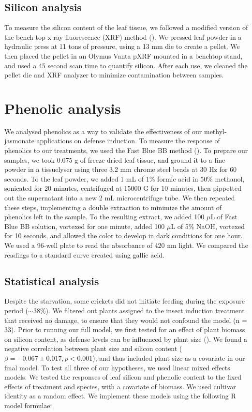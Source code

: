 \documentclass[12pt, letterpaper, ]{report}
\begin{document}
\subsection{Silicon analysis}

To measure the silicon content of the leaf tissue, we followed a modified version of the bench-top x-ray fluorescence (XRF) method (\cite{reidinger_rapid_2012}). We pressed leaf powder in a hydraulic press at 11 tons of pressure, using a 13 mm die to create a pellet. We then placed the pellet in an Olymus Vanta pXRF mounted in a benchtop stand, and used a 45 second scan time to quantify silicon. After each use, we cleaned the pellet die and XRF analyzer to minimize contamination between samples.

\section{Phenolic analysis}

We analysed phenolics as a way to validate the effectiveness of our methyl-jasmonate applications on defense induction. To measure the response of phenolics to our treatments, we used the Fast Blue BB method (\cite{pico2020systematic}). To prepare our samples, we took 0.075 g of freeze-dried leaf tissue, and ground it to a fine powder in a tissuelyser using three 3.2 mm chrome steel beads at 30 Hz for 60 seconds. To the leaf powder, we added 1 mL of 1\% formic acid in 50\% methanol, sonicated for 20 minutes, centrifuged at 15000 G for 10 minutes, then pippetted out the supernatant into a new 2 mL  microcentrifuge tube. We then repeated these steps, implementing a double extraction to minimize the amount of phenolics left in the sample. To the resulting extract, we added 100 $\mu$L of Fast Blue BB solution, vortexed for one minute, added 100 $\mu$L of 5\% NaOH, vortexed for 10 seconds, and allowed the color to develop in dark conditions for one hour. We used a 96-well plate to read the absorbance of 420 nm light. We compared the readings to a standard curve created using gallic acid. 

\subsection{Statistical analysis}

Despite the starvation, some crickets did not initiate feeding during the exposure period ($\sim38\%$). We filtered out plants assigned to the insect induction treatment that received no damage, to ensure that they would not confound the model (n = 33). Prior to running our full model, we first tested for an effect of plant biomass on silicon content, as defense levels can be influenced by plant size (\cite{carmona_plant_2011}). We found a negative correlation between plant size and silicon content ($\beta = -0.067 \pm 0.017, p < 0.001$), and thus included plant size as a covariate in our final model. To test all three of our hypotheses, we used linear mixed effects models. We tested the responses of leaf silicon and phenolic content to the fixed effects of treatment and species, with a covariate of biomass. We used cultivar identity as a random effect. We implement these models using the following R model formulae:
\end{document}
